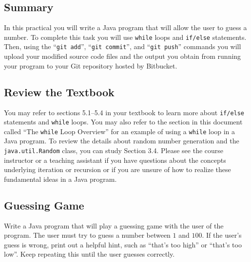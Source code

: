 



\subsection*{Summary}
\vspace*{-.05in}

In this practical you will write a Java program that will allow the user to guess a number. To complete this task you will use {\tt while} loops and {\tt if/else} statements.  Then, using the ``{\tt git add}'', ``{\tt git  commit}'', and ``{\tt git push}'' commands you will
upload your modified source code files and the output you obtain from running your program to your Git repository hosted
by Bitbucket.

\vspace*{-.1in}
\subsection*{Review the Textbook}
\vspace*{-.05in}

You may refer to sections 5.1--5.4 in your textbook to learn more about {\tt if/else} statements and {\tt while} loops.
You may also refer to the section in this document called ``The {\tt while} Loop Overview'' for an example of using a
{\tt while} loop in a Java program. To review the details about random number generation and the {\tt java.util.Random}
class, you can study Section 3.4. Please see the course instructor or a teaching assistant if you have questions about
the concepts underlying iteration or recursion or if you are unsure of how to realize these fundamental ideas in a Java
program.

\vspace*{-.1in}
\subsection*{Guessing Game}
\vspace*{-.05in}

Write a Java program that will play a guessing game with the user of the program.  The user must try to guess a number
between $1$ and $100$. If the user's guess is wrong, print out a helpful hint, such as ``that's too high'' or ``that's
too low''. Keep repeating this until the user guesses correctly.

